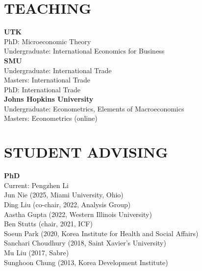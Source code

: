 \documentclass[11pt]{res}
\begin{document}
\begin{resume}
\section{TEACHING} \vspace{1.5mm}
\textbf{UTK}\vspace{1.5mm}\\
PhD: Microeconomic Theory\vspace{1.5mm}\\
Undergraduate: International Economics for Business\vspace{4mm}\\
\textbf{SMU}\vspace{1.5mm}\\
Undergraduate: International Trade\vspace{1.5mm}\\
Masters: International Trade\vspace{1.5mm}\\
PhD: International Trade\vspace{4mm}\\
\textbf{Johns Hopkins University}\vspace{1.5mm}\\
Undergraduate: Econometrics, Elements of Macroeconomics\vspace{1.5mm}\\
Masters: Econometrics (online)

\section{STUDENT ADVISING} \vspace{1.5mm}
\textbf{PhD}\vspace{1.5mm}\\
Current: Pengzhen Li\vspace{1.5mm}\\
Jun Nie (2025, Miami University, Ohio)\vspace{1.5mm}\\
Ding Liu (co-chair, 2022, Analysis Group)\vspace{1.5mm}\\
Aastha Gupta (2022, Western Illinois University)\vspace{1.5mm}\\
Ben Stutts (chair, 2021, ICF)\vspace{1.5mm}\\
Soeun Park (2020, Korea Institute for Health and Social Affairs)\vspace{1.5mm}\\
Sanchari Choudhury (2018, Saint Xavier's University)\vspace{1.5mm}\\
Mu Liu (2017, Sabre)\vspace{1.5mm}\\
Sunghoon Chung (2013, Korea Development Institute)


\end{resume}
\end{document}

